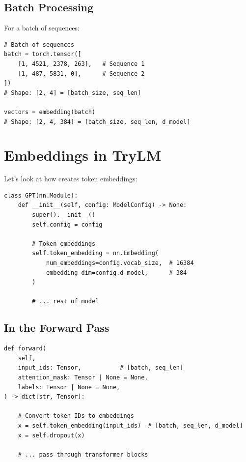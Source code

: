 \subsection{Batch Processing}

For a batch of sequences:

\begin{lstlisting}[style=python]
# Batch of sequences
batch = torch.tensor([
    [1, 4521, 2378, 263],   # Sequence 1
    [1, 487, 5831, 0],      # Sequence 2
])
# Shape: [2, 4] = [batch_size, seq_len]

vectors = embedding(batch)
# Shape: [2, 4, 384] = [batch_size, seq_len, d_model]
\end{lstlisting}

\section{Embeddings in TryLM}

Let's look at how \TryLM creates token embeddings:

\begin{lstlisting}[style=python, caption={Token embedding from model.py}]
class GPT(nn.Module):
    def __init__(self, config: ModelConfig) -> None:
        super().__init__()
        self.config = config

        # Token embeddings
        self.token_embedding = nn.Embedding(
            num_embeddings=config.vocab_size,  # 16384
            embedding_dim=config.d_model,      # 384
        )

        # ... rest of model
\end{lstlisting}

\subsection{In the Forward Pass}

\begin{lstlisting}[style=python, caption={Embedding lookup in forward pass}]
def forward(
    self,
    input_ids: Tensor,           # [batch, seq_len]
    attention_mask: Tensor | None = None,
    labels: Tensor | None = None,
) -> dict[str, Tensor]:

    # Convert token IDs to embeddings
    x = self.token_embedding(input_ids)  # [batch, seq_len, d_model]
    x = self.dropout(x)

    # ... pass through transformer blocks
\end{lstlisting}


